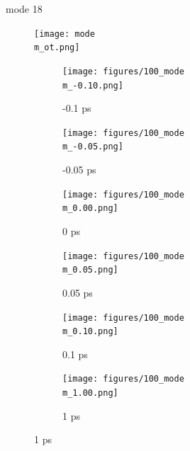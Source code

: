 \documentclass{beamer}
\newcommand\w{0.32}
\begin{document}
\renewcommand\m{18}
\begin{frame}{mode \m}
				\vspace{\vh mm}
	\begin{figure}
		\centering
		\texttt{[image: mode\\m\_ot.png]}
	\end{figure}
	\begin{figure}
		\centering
		\begin{subfigure}[b]{\w\textwidth}
			\centering
			\texttt{[image: figures/100\_mode\\m\_-0.10.png]}
			\caption{-0.1 ps}
		\end{subfigure}
		\begin{subfigure}[b]{\w\textwidth}
			\centering
			\texttt{[image: figures/100\_mode\\m\_-0.05.png]}
			\caption{-0.05 ps}
		\end{subfigure}
		\begin{subfigure}[b]{\w\textwidth}
			\centering
			\texttt{[image: figures/100\_mode\\m\_0.00.png]}
			\caption{0 ps}
		\end{subfigure}
		\begin{subfigure}[b]{\w\textwidth}
			\centering
			\texttt{[image: figures/100\_mode\\m\_0.05.png]}
			\caption{0.05 ps}
		\end{subfigure}
		\begin{subfigure}[b]{\w\textwidth}
			\centering
			\texttt{[image: figures/100\_mode\\m\_0.10.png]}
			\caption{0.1 ps}
		\end{subfigure}
		\begin{subfigure}[b]{\w\textwidth}
			\centering
			\texttt{[image: figures/100\_mode\\m\_1.00.png]}
			\caption{1 ps}
		\end{subfigure}
	\end{figure}
\end{frame}
\end{document}
